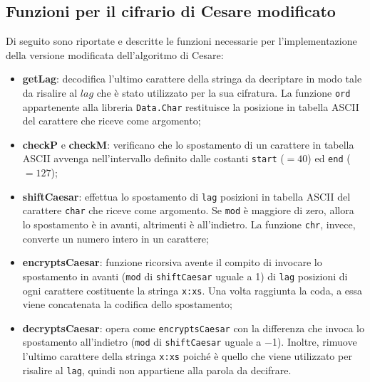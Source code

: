 \documentclass[a4paper, 12pt, one column, aas_macros]{article}
\begin{document}
	\subsection{Funzioni per il cifrario di Cesare modificato}
	Di seguito sono riportate e descritte le funzioni necessarie per l'implementazione della versione modificata dell'algoritmo di Cesare:
	\begin{itemize}
		\item \textbf{getLag}: decodifica l'ultimo carattere della stringa da decriptare in modo tale da risalire al $lag$ che è stato utilizzato per la sua cifratura. La funzione \verb|ord| appartenente alla libreria \verb|Data.Char| restituisce la posizione in tabella ASCII del carattere che riceve come argomento;
		
		\item \textbf{checkP} e \textbf{checkM}: verificano che lo spostamento di un carattere in tabella ASCII avvenga nell'intervallo definito dalle costanti \verb|start| ($=40$) ed \verb|end| ($=127$);
		
		\item \textbf{shiftCaesar}: effettua lo spostamento di \verb|lag| posizioni in tabella ASCII del carattere \verb|char| che riceve come argomento. Se \verb|mod| è maggiore di zero, allora lo spostamento è in avanti, altrimenti è all'indietro. La funzione \verb|chr|, invece, converte un numero intero in un carattere;
		
		\item \textbf{encryptsCaesar}: funzione ricorsiva avente il compito di invocare lo spostamento in avanti (\verb|mod| di \verb|shiftCaesar| uguale a \num{1}) di \verb|lag| posizioni di ogni carattere costituente la stringa \verb|x:xs|. Una volta raggiunta la coda, a essa viene concatenata la codifica dello spostamento;
		
		\item \textbf{decryptsCaesar}: opera come \verb|encryptsCaesar| con la differenza che invoca lo spostamento all'indietro (\verb|mod| di \verb|shiftCaesar| uguale a \num{-1}). Inoltre, rimuove l'ultimo carattere della stringa \verb|x:xs| poiché è quello che viene utilizzato per risalire al \verb|lag|, quindi non appartiene alla parola da decifrare.
	\end{itemize}
	
\end{document}

